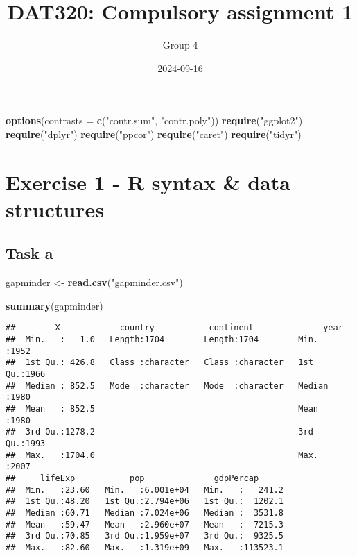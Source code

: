 \documentclass[
]{article}
\title{DAT320: Compulsory assignment 1}
\author{Group 4}
\date{2024-09-16}
\newenvironment{Shaded}{\begin{snugshade}}{\end{snugshade}}
\newcommand{\AttributeTok}[1]{\textcolor[rgb]{0.13,0.29,0.53}{#1}}
\newcommand{\FunctionTok}[1]{\textcolor[rgb]{0.13,0.29,0.53}{\textbf{#1}}}
\newcommand{\NormalTok}[1]{#1}
\newcommand{\OtherTok}[1]{\textcolor[rgb]{0.56,0.35,0.01}{#1}}
\newcommand{\StringTok}[1]{\textcolor[rgb]{0.31,0.60,0.02}{#1}}
\begin{document}
\maketitle

\begin{Shaded}
\begin{Highlighting}[]
\FunctionTok{options}\NormalTok{(}\AttributeTok{contrasts =} \FunctionTok{c}\NormalTok{(}\StringTok{"contr.sum"}\NormalTok{, }\StringTok{"contr.poly"}\NormalTok{))}
\FunctionTok{require}\NormalTok{(}\StringTok{"ggplot2"}\NormalTok{)}
\FunctionTok{require}\NormalTok{(}\StringTok{"dplyr"}\NormalTok{)}
\FunctionTok{require}\NormalTok{(}\StringTok{"ppcor"}\NormalTok{)}
\FunctionTok{require}\NormalTok{(}\StringTok{"caret"}\NormalTok{)}
\FunctionTok{require}\NormalTok{(}\StringTok{"tidyr"}\NormalTok{)}
\end{Highlighting}
\end{Shaded}

\section{Exercise 1 - R syntax \& data
structures}\label{exercise-1---r-syntax-data-structures}

\subsection{Task a}\label{task-a}

\begin{Shaded}
\begin{Highlighting}[]
\NormalTok{gapminder }\OtherTok{\textless{}{-}} \FunctionTok{read.csv}\NormalTok{(}\StringTok{"gapminder.csv"}\NormalTok{)}

\FunctionTok{summary}\NormalTok{(gapminder)}
\end{Highlighting}
\end{Shaded}

\begin{verbatim}
##        X            country           continent              year     
##  Min.   :   1.0   Length:1704        Length:1704        Min.   :1952  
##  1st Qu.: 426.8   Class :character   Class :character   1st Qu.:1966  
##  Median : 852.5   Mode  :character   Mode  :character   Median :1980  
##  Mean   : 852.5                                         Mean   :1980  
##  3rd Qu.:1278.2                                         3rd Qu.:1993  
##  Max.   :1704.0                                         Max.   :2007  
##     lifeExp           pop              gdpPercap       
##  Min.   :23.60   Min.   :6.001e+04   Min.   :   241.2  
##  1st Qu.:48.20   1st Qu.:2.794e+06   1st Qu.:  1202.1  
##  Median :60.71   Median :7.024e+06   Median :  3531.8  
##  Mean   :59.47   Mean   :2.960e+07   Mean   :  7215.3  
##  3rd Qu.:70.85   3rd Qu.:1.959e+07   3rd Qu.:  9325.5  
##  Max.   :82.60   Max.   :1.319e+09   Max.   :113523.1
\end{verbatim}
\end{document}
